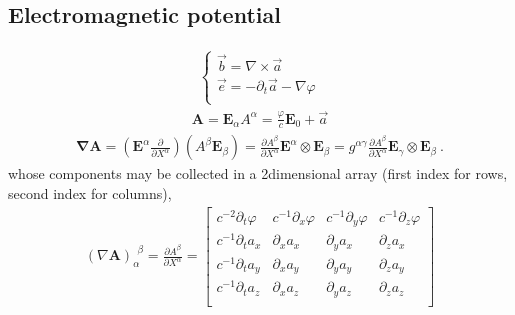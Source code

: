 \documentclass[letterpaper,10pt,english]{jupyterBook}
\begin{document}
\subsection{Electromagnetic potential}
\label{\detokenize{ch/relativity-special/notes:electromagnetic-potential}}\begin{equation*}
\begin{split}\begin{cases}
 \vec{b} = \nabla \times \vec{a} \\
 \vec{e} = -\partial_t \vec{a} - \nabla \varphi \\
\end{cases}\end{split}
\end{equation*}\begin{equation*}
\begin{split}\mathbf{A} = \mathbf{E}_{\alpha} A^{\alpha} = \frac{\varphi}{c} \mathbf{E}_0 + \vec{a}\end{split}
\end{equation*}\begin{equation*}
\begin{split}\symbf{\nabla} \mathbf{A} =
\left( \mathbf{E}^{\alpha} \frac{\partial}{\partial X^{\alpha}} \right) \left( A^{\beta} \mathbf{E}_{\beta} \right)
= \frac{\partial A^{\beta}}{\partial X^{\alpha}} \mathbf{E}^{\alpha} \otimes \mathbf{E}_{\beta} 
= g^{\alpha \gamma} \frac{\partial A^{\beta}}{\partial X^{\alpha}} \mathbf{E}_{\gamma} \otimes \mathbf{E}_{\beta}  \ .\end{split}
\end{equation*}
\sphinxAtStartPar
whose components may be collected in a 2\sphinxhyphen{}dimensional array (first index for rows, second index for columns),
\begin{equation*}
\begin{split}(\nabla \mathbf{A})_{\alpha}^{\ \ \beta} = \frac{\partial A^{\beta}}{\partial X^{\alpha}} =
\begin{bmatrix}
 c^{-2} \partial_t \varphi & c^{-1}\partial_x \varphi & c^{-1}\partial_y \varphi & c^{-1}\partial_z \varphi \\
 c^{-1} \partial_t a_x     &       \partial_x a_x     &       \partial_y a_x     &       \partial_z a_x     \\
 c^{-1} \partial_t a_y     &       \partial_x a_y     &       \partial_y a_y     &       \partial_z a_y     \\
 c^{-1} \partial_t a_z     &       \partial_x a_z     &       \partial_y a_z     &       \partial_z a_z     \\
\end{bmatrix}\end{split}
\end{equation*}
\end{document}

